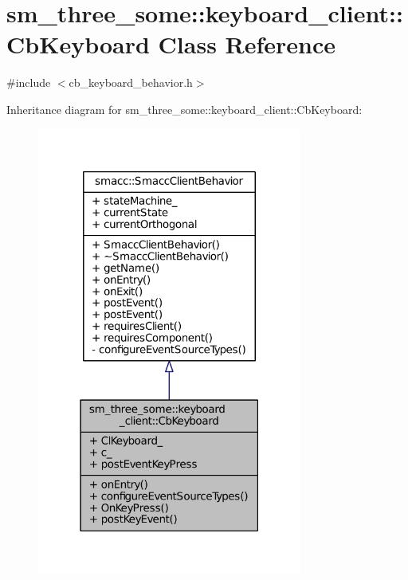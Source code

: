 \hypertarget{classsm__three__some_1_1keyboard__client_1_1CbKeyboard}{}\section{sm\+\_\+three\+\_\+some\+:\+:keyboard\+\_\+client\+:\+:Cb\+Keyboard Class Reference}
\label{classsm__three__some_1_1keyboard__client_1_1CbKeyboard}


{\ttfamily \#include $<$cb\+\_\+keyboard\+\_\+behavior.\+h$>$}



Inheritance diagram for sm\+\_\+three\+\_\+some\+:\+:keyboard\+\_\+client\+:\+:Cb\+Keyboard\+:
\nopagebreak
\begin{figure}[H]
\begin{center}
\leavevmode
\includegraphics[width=247pt]{classsm__three__some_1_1keyboard__client_1_1CbKeyboard__inherit__graph}
\end{center}
\end{figure}



